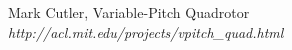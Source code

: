 \section *  {}

\begin{thebibliography}{5}

             Mark Cutler, Variable-Pitch Quadrotor \\ 
\textit{http://acl.mit.edu/projects/vpitch_quad.html}

\end{thebibliography}